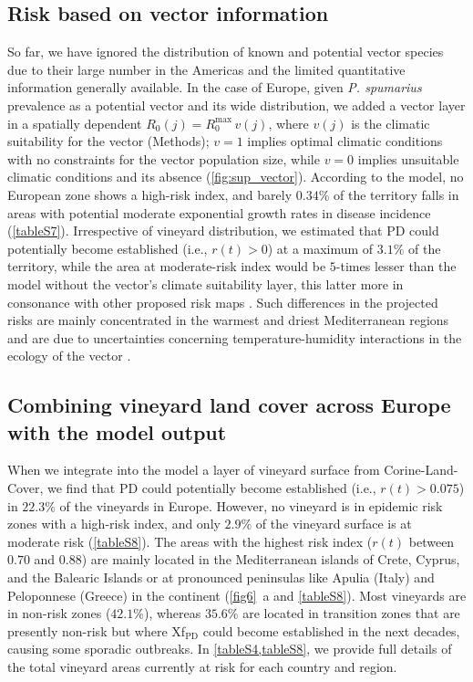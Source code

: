     \subsection{Risk based on vector information}

    So far, we have ignored the distribution of known and potential vector
    species due to their large number in the Americas and the limited
    quantitative information generally available. In the case of Europe, given
    \textit{P. spumarius} prevalence as a potential
    vector and its wide distribution, we added	a vector layer in a spatially
    dependent $R_0(j) = R_0^{\textrm{max}}\, v(j)$, where $v(j)$ is the
    climatic suitability for the vector (Methods); $v=1$ implies optimal
    climatic conditions with no constraints for the vector population size,
    while $v=0$ implies unsuitable climatic conditions and its absence
    (\cref{fig:sup_vector}). According to the model, no European zone shows a
    high-risk index, and barely $0.34\%$ of the territory falls in areas with
    potential moderate exponential growth rates in disease incidence
    (\cref{tableS7}). Irrespective of vineyard distribution, we estimated that
    PD could potentially become established (i.e., $r(t) > 0$) at a maximum of
$3.1\%$ of the territory, while the area at moderate-risk index would be
$5$-times lesser than the model without the vector's climate suitability layer,
    this latter more in consonance with other proposed risk maps
    \cite{Godefroid2019,Bragard2019}. Such differences in the projected risks
    are mainly concentrated in the warmest and driest Mediterranean regions and
    are due to uncertainties concerning temperature-humidity interactions in
    the ecology of the vector \cite{Godefroid2021}.

    \subsection{Combining vineyard land cover across Europe with the model
        output}
    When we integrate into the model a layer of vineyard surface from
    Corine-Land-Cover, we find that PD could potentially become established
    (i.e., $r(t)>0.075$) in $22.3\%$ of the vineyards in Europe. However, no
    vineyard is in epidemic risk zones with a high-risk index, and only $2.9\%$
    of the vineyard surface is at moderate risk (\cref{tableS8}). The areas
    with the highest risk index ($r(t)$ between $0.70$ and $0.88$) are mainly
    located in the Mediterranean islands of Crete, Cyprus, and the Balearic
    Islands or at pronounced peninsulas like Apulia (Italy) and Peloponnese
    (Greece) in the continent (\cref{fig6}~\textcolor{ref_color}{a} and
    \cref{tableS8}). Most vineyards are in non-risk zones ($42.1\%$), whereas
$35.6\%$ are located in transition zones that are presently non-risk but where
    Xf$_{\textrm{PD}}$ could become established in the next decades, causing
    some sporadic outbreaks. In \cref{tableS4,tableS8}, we provide full details
    of the total vineyard areas currently at risk for each country and region.

